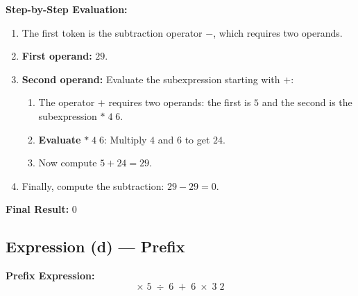 \documentclass[12pt]{article}
\begin{document}
\textbf{Step-by-Step Evaluation:}
\begin{enumerate}[label=\textbf{Step \arabic*:}, leftmargin=*]
    \item The first token is the subtraction operator \(-\), which requires two operands.
    \item \textbf{First operand:} \(29\).
    \item \textbf{Second operand:} Evaluate the subexpression starting with \(+\):
    \begin{enumerate}[label=\(\bullet\)]
        \item The operator \(+\) requires two operands: the first is \(5\) and the second is the subexpression \( *\; 4\; 6\).
        \item \textbf{Evaluate} \( *\; 4\; 6\): Multiply \(4\) and \(6\) to get \(24\).
        \item Now compute \(5 + 24 = 29\).
    \end{enumerate}
    \item Finally, compute the subtraction: \(29 - 29 = 0\).
\end{enumerate}

\textbf{Final Result:} \(\boxed{0}\)

\newpage
\subsection*{Expression (d) --- Prefix}
\textbf{Prefix Expression:}
\[
\times\; 5\; \div\; 6\; +\; 6\; \times\; 3\; 2
\]
\end{document}
